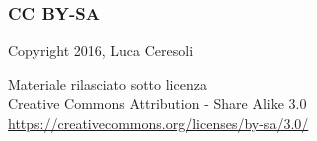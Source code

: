 \documentclass[xetex,table]{beamer}
\begin{document}
\begin{frame}
  \frametitle{CC BY-SA}
  \begin{center}
    \textcopyright{} Copyright 2016, Luca Ceresoli\\

    \vspace{0.05\textheight}

    \small
    Materiale rilasciato sotto licenza\\
    Creative Commons Attribution - Share Alike 3.0 \\
    \url{https://creativecommons.org/licenses/by-sa/3.0/} \\
  \end{center}
\end{frame}
\end{document}
